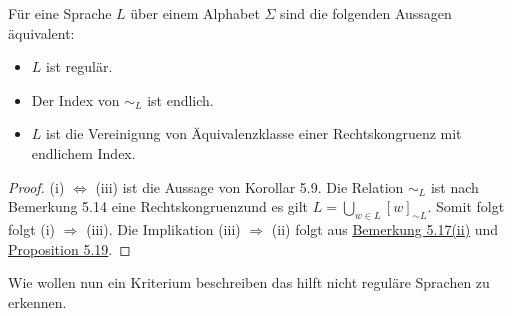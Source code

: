 


Für eine Sprache $L$ über einem Alphabet $\Sigma$ sind die folgenden Aussagen äquivalent:
\begin{itemize}
  \item [(i)] $L$ ist regulär.
  \item [(ii)] Der Index von $\sim_{L}$ ist endlich.
  \item [(iii)] $L$ ist die Vereinigung von Äquivalenzklasse einer Rechtskongruenz mit endlichem Index.
\end{itemize}

\begin{proof}
  (i) $\Leftrightarrow$ (iii) ist die Aussage von Korollar 5.9. Die Relation $\sim_L$ ist nach Bemerkung 5.14 eine Rechtskongruenzund es gilt $L = \bigcup \limits_{w \in L} [w]_{\sim L}$. Somit folgt folgt (i) $\Rightarrow$ (iii). Die Implikation (iii) $\Rightarrow$ (ii) folgt aus \hyperref[subsec:5.17]{Bemerkung 5.17(ii)} und \hyperref[subsec:5.19]{Proposition 5.19}.
\end{proof}

Wie wollen nun ein Kriterium beschreiben das hilft nicht reguläre Sprachen zu erkennen.

